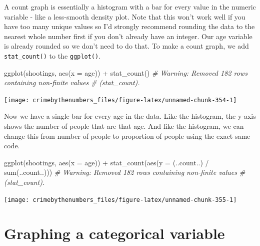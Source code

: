 \documentclass[
]{krantz}
\makeatletter
\newenvironment{Shaded}{\begin{snugshade}}{\end{snugshade}}
\newcommand{\AttributeTok}[1]{\textcolor[rgb]{0.61,0.61,0.61}{#1}}
\newcommand{\CommentTok}[1]{\textcolor[rgb]{0.37,0.37,0.37}{\textit{#1}}}
\newcommand{\FunctionTok}[1]{\textcolor[rgb]{0,0,0}{#1}}
\newcommand{\NormalTok}[1]{#1}
\newcommand{\SpecialCharTok}[1]{\textcolor[rgb]{0,0,0}{#1}}
\newenvironment{kframe}{%
\medskip{}
\setlength{\fboxsep}{.8em}
 \def\at@end@of@kframe{}%
 \ifinner\ifhmode%
  \def\at@end@of@kframe{\end{minipage}}%
  \begin{minipage}{\columnwidth}%
 \fi\fi%
 \def\FrameCommand##1{\hskip\@totalleftmargin \hskip-\fboxsep
 \colorbox{shadecolor}{##1}\hskip-\fboxsep
     \hskip-\linewidth \hskip-\@totalleftmargin \hskip\columnwidth}%
 \MakeFramed {\advance\hsize-\width
   \@totalleftmargin\z@ \linewidth\hsize
   \@setminipage}}%
 {\par\unskip\endMakeFramed%
 \at@end@of@kframe}
\renewenvironment{Shaded}{\begin{kframe}}{\end{kframe}}
\makeatother
\begin{document}
A count graph is essentially a histogram with a bar for
every value in the numeric variable - like a less-smooth
density plot. Note that this won't work well if you have too
many unique values so I'd strongly recommend rounding the
data to the nearest whole number first if you don't already
have an integer. Our age variable is already rounded so we
don't need to do that. To make a count graph, we add
\texttt{stat\_count()} to the \texttt{ggplot()}.

\begin{Shaded}
\begin{Highlighting}[]
\FunctionTok{ggplot}\NormalTok{(shootings, }\FunctionTok{aes}\NormalTok{(}\AttributeTok{x =}\NormalTok{ age)) }\SpecialCharTok{+}
  \FunctionTok{stat\_count}\NormalTok{()}
\CommentTok{\# Warning: Removed 182 rows containing non{-}finite values}
\CommentTok{\# (stat\_count).}
\end{Highlighting}
\end{Shaded}

\begin{center}\texttt{[image: crimebythenumbers\_files/figure-latex/unnamed-chunk-354-1]} \end{center}

Now we have a single bar for every age in the data. Like the
histogram, the y-axis shows the number of people that are
that age. And like the histogram, we can change this from
number of people to proportion of people using the exact
same code.

\begin{Shaded}
\begin{Highlighting}[]
\FunctionTok{ggplot}\NormalTok{(shootings, }\FunctionTok{aes}\NormalTok{(}\AttributeTok{x =}\NormalTok{ age)) }\SpecialCharTok{+}
  \FunctionTok{stat\_count}\NormalTok{(}\FunctionTok{aes}\NormalTok{(}\AttributeTok{y =}\NormalTok{ (..count..) }\SpecialCharTok{/} \FunctionTok{sum}\NormalTok{(..count..)))}
\CommentTok{\# Warning: Removed 182 rows containing non{-}finite values}
\CommentTok{\# (stat\_count).}
\end{Highlighting}
\end{Shaded}

\begin{center}\texttt{[image: crimebythenumbers\_files/figure-latex/unnamed-chunk-355-1]} \end{center}

\hypertarget{graphing-a-categorical-variable}{%
\section{Graphing a categorical
variable}\label{graphing-a-categorical-variable}}
\end{document}
